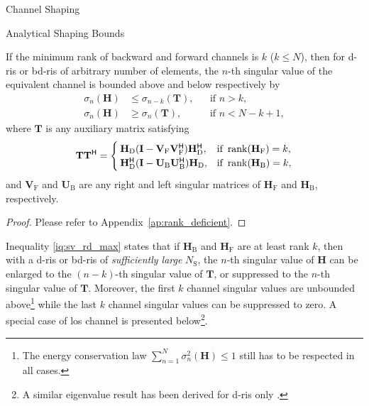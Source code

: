 \documentclass[journal]{IEEEtran}
\begin{document}
\begin{section}{Channel Shaping}
\begin{subsection}{Analytical Shaping Bounds}
		\begin{proposition}
			\label{pp:rd}
			If the minimum rank of backward and forward channels is $k$ ($k \le N$),
			then for \gls{d}-\gls{ris} or \gls{bd}-\gls{ris} of arbitrary number of elements, the $n$-th singular value of the equivalent channel is bounded above and below respectively by
			\begin{subequations}
				\label{iq:sv_rd}
				\begin{align}
					\sigma_n(\mathbf{H}) & \le \sigma_{n-k}(\mathbf{T}), &  & \text{if } n > k, \label{iq:sv_rd_max}          \\
					\sigma_n(\mathbf{H}) & \ge \sigma_n(\mathbf{T}),     &  & \text{if } n < N - k + 1, \label{iq:sv_rd_min}
				\end{align}
			\end{subequations}
			where $\mathbf{T}$ is any auxiliary matrix satisfying
			\begin{equation}
				\label{eq:auxiliary_rd}
				\mathbf{T} \mathbf{T}^\mathsf{H} =
				\begin{cases}
					\mathbf{H}_\mathrm{D} (\mathbf{I} - \mathbf{V}_\mathrm{F} \mathbf{V}_\mathrm{F}^\mathsf{H}) \mathbf{H}_\mathrm{D}^\mathsf{H}, & \text{if } \operatorname{rank}(\mathbf{H}_\mathrm{F}) = k, \\
					\mathbf{H}_\mathrm{D}^\mathsf{H} (\mathbf{I} - \mathbf{U}_\mathrm{B} \mathbf{U}_\mathrm{B}^\mathsf{H}) \mathbf{H}_\mathrm{D}, & \text{if } \operatorname{rank}(\mathbf{H}_\mathrm{B}) = k,
				\end{cases}
			\end{equation}
			and $\mathbf{V}_\mathrm{F}$ and $\mathbf{U}_\mathrm{B}$ are any right and left singular matrices of $\mathbf{H}_\mathrm{F}$ and $\mathbf{H}_\mathrm{B}$, respectively.
		\end{proposition}
		\begin{proof}
			Please refer to Appendix~\ref{ap:rank_deficient}.
		\end{proof}

		Inequality \eqref{iq:sv_rd_max} states that
		if $\mathbf{H}_\mathrm{B}$ and $\mathbf{H}_\mathrm{F}$ are at least rank $k$, then
		with a \gls{d}-\gls{ris} or \gls{bd}-\gls{ris} of \emph{sufficiently large} $N_\mathrm{S}$,
		the $n$-th singular value of $\mathbf{H}$ can be enlarged to the $(n-k)$-th singular value of $\mathbf{T}$, or suppressed to the $n$-th singular value of $\mathbf{T}$.
		Moreover, the first $k$ channel singular values are unbounded above\footnote{The energy conservation law $\sum_{n=1}^N \sigma_n^2(\mathbf{H}) \le 1$ still has to be respected in all cases.} while the last $k$ channel singular values can be suppressed to zero.
		A special case of \gls{los} channel is presented below\footnote{A similar eigenvalue result has been derived for \gls{d}-\gls{ris} only \cite{Semmler2023}.}.



\end{subsection}
\end{section}
\end{document}
